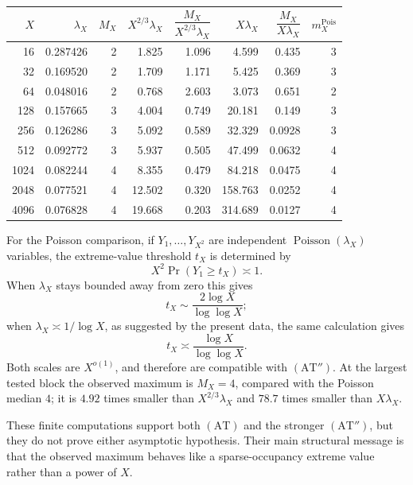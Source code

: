 \begin{center}
\begin{tabular}{rrrrrrrr}
\toprule
\(X\) & \(\lambda_X\) & \(M_X\) &
\(X^{2/3}\lambda_X\) &
\(\dfrac{M_X}{X^{2/3}\lambda_X}\) &
\(X\lambda_X\) &
\(\dfrac{M_X}{X\lambda_X}\) &
\(m_X^{\mathrm{Pois}}\)\\
\midrule
16   & 0.287426 & 2 & 1.825  & 1.096 & 4.599   & 0.435  & 3\\
32   & 0.169520 & 2 & 1.709  & 1.171 & 5.425   & 0.369  & 3\\
64   & 0.048016 & 2 & 0.768  & 2.603 & 3.073   & 0.651  & 2\\
128  & 0.157665 & 3 & 4.004  & 0.749 & 20.181  & 0.149  & 3\\
256  & 0.126286 & 3 & 5.092  & 0.589 & 32.329  & 0.0928 & 3\\
512  & 0.092772 & 3 & 5.937  & 0.505 & 47.499  & 0.0632 & 4\\
1024 & 0.082244 & 4 & 8.355  & 0.479 & 84.218  & 0.0475 & 4\\
2048 & 0.077521 & 4 & 12.502 & 0.320 & 158.763 & 0.0252 & 4\\
4096 & 0.076828 & 4 & 19.668 & 0.203 & 314.689 & 0.0127 & 4\\
\bottomrule
\end{tabular}
\end{center}

For the Poisson comparison, if \(Y_1,\ldots,Y_{X^2}\) are independent
\(\operatorname{Poisson}(\lambda_X)\) variables, the extreme-value
threshold \(t_X\) is determined by
\[
 X^2\Pr(Y_1\ge t_X)\asymp1.
\]
When \(\lambda_X\) stays bounded away from zero this gives
\[
 t_X\sim\frac{2\log X}{\log\log X};
\]
when \(\lambda_X\asymp1/\log X\), as suggested by the present data,
the same calculation gives
\[
 t_X\asymp\frac{\log X}{\log\log X}.
\]
Both scales are \(X^{o(1)}\), and therefore are compatible with
\((\mathrm{AT}'')\).  At the largest tested block the observed maximum
is \(M_X=4\), compared with the Poisson median \(4\);
it is \(4.92\) times smaller than \(X^{2/3}\lambda_X\) and
\(78.7\) times smaller than \(X\lambda_X\).

\begin{remark}
These finite computations support both \((\mathrm{AT})\) and the
stronger \((\mathrm{AT}'')\), but they do not prove either asymptotic
hypothesis.  Their main structural message is that the observed maximum
behaves like a sparse-occupancy extreme value rather than a power of
\(X\).
\end{remark}

%
